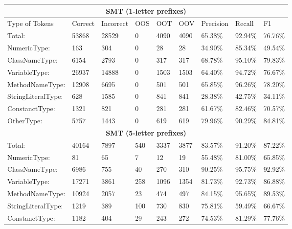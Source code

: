 \begin{table}[]
\tiny
\begin{tabular}{|l|l|l|l|l|l|l|l|l|}
\hline
\multicolumn{9}{|c|}{\textbf{SMT (1-letter prefixes)}}                                        \\ \hline
Type of Tokens     & Correct & Incorrect & OOS  & OOT  & OOV  & Precision & Recall  & F1      \\ \hline
Total:             & 53868   & 28529     & 0    & 4090 & 4090 & 65.38\%   & 92.94\% & 76.76\% \\ \hline
NumericType:       & 163     & 304       & 0    & 28   & 28   & 34.90\%   & 85.34\% & 49.54\% \\ \hline
ClassNameType:     & 6154    & 2793      & 0    & 317  & 317  & 68.78\%   & 95.10\% & 79.83\% \\ \hline
VariableType:      & 26937   & 14888     & 0    & 1503 & 1503 & 64.40\%   & 94.72\% & 76.67\% \\ \hline
MethodNameType:    & 12908   & 6695      & 0    & 501  & 501  & 65.85\%   & 96.26\% & 78.20\% \\ \hline
StringLiteralType: & 628     & 1585      & 0    & 841  & 841  & 28.38\%   & 42.75\% & 34.11\% \\ \hline
ConstanctType:     & 1321    & 821       & 0    & 281  & 281  & 61.67\%   & 82.46\% & 70.57\% \\ \hline
OtherType:         & 5757    & 1443      & 0    & 619  & 619  & 79.96\%   & 90.29\% & 84.81\% \\ \hline
\multicolumn{9}{|c|}{\textbf{SMT (5-letter prefixes)}}                                        \\ \hline
Total:             & 40164   & 7897      & 540  & 3337 & 3877 & 83.57\%   & 91.20\% & 87.22\% \\ \hline
NumericType:       & 81      & 65        & 7    & 12   & 19   & 55.48\%   & 81.00\% & 65.85\% \\ \hline
ClassNameType:     & 6986    & 755       & 40   & 270  & 310  & 90.25\%   & 95.75\% & 92.92\% \\ \hline
VariableType:      & 17271   & 3861      & 258  & 1096 & 1354 & 81.73\%   & 92.73\% & 86.88\% \\ \hline
MethodNameType:    & 10924   & 2057      & 23   & 474  & 497  & 84.15\%   & 95.65\% & 89.53\% \\ \hline
StringLiteralType: & 1219    & 389       & 100  & 730  & 830  & 75.81\%   & 59.49\% & 66.67\% \\ \hline
ConstanctType:     & 1182    & 404       & 29   & 243  & 272  & 74.53\%   & 81.29\% & 77.76\% \\ \hline

\end{tabular}
\end{table}
